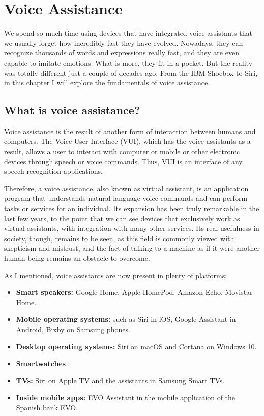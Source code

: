 \chapter{Voice Assistance}

We spend so much time using devices that have integrated voice assistants that we usually forget how incredibly fast they have
evolved. Nowadays, they can recognize thousands of words and expressions really fast, and they are even capable to imitate
emotions. What is more, they fit in a pocket. But the reality was totally different just a couple of decades ago. From the IBM
Shoebox to Siri, in this chapter I will explore the fundamentals of voice assistance.

\section{What is voice assistance?}
Voice assistance is the result of another form of interaction between humans and computers.\cite{botsocietyVUI} The Voice User
Interface (VUI), which has the voice assistants as a result, allows a user to interact with computer or mobile or other electronic 
devices through speech or voice commands. Thus, VUI is an interface of any speech recognition applications.

Therefore, a voice assistance, also known as virtual assistant, is an application program that understands natural language voice 
commands and can perform tasks or services for an individual. Its expansion has been truly remarkable in the last few years, to the
point that we can see devices that exclusively work as virtual assistants, with integration with many other services. Its real usefulness
in society, though, remains to be seen, as this field is commonly viewed with skepticism and mistrust, and the fact of talking to a 
machine as if it were another human being remains an obstacle to overcome.

As I mentioned, voice assistants are now present in plenty of platforms:

\begin{itemize}
	\item \textbf{Smart speakers:} Google Home, Apple HomePod, Amazon Echo, Movistar Home.
	\item \textbf{Mobile operating systems:} such as Siri in iOS, Google Assistant in Android, Bixby on Samsung phones.
	\item \textbf{Desktop operating systems:} Siri on macOS and Cortana on Windows 10.
	\item \textbf{Smartwatches} 
	\item \textbf{TVs:} Siri on Apple TV and the assistants in Samsung Smart TVs.
	\item \textbf{Inside mobile apps:} EVO Assistant in the mobile application of the Spanish bank EVO.
\end{itemize}


